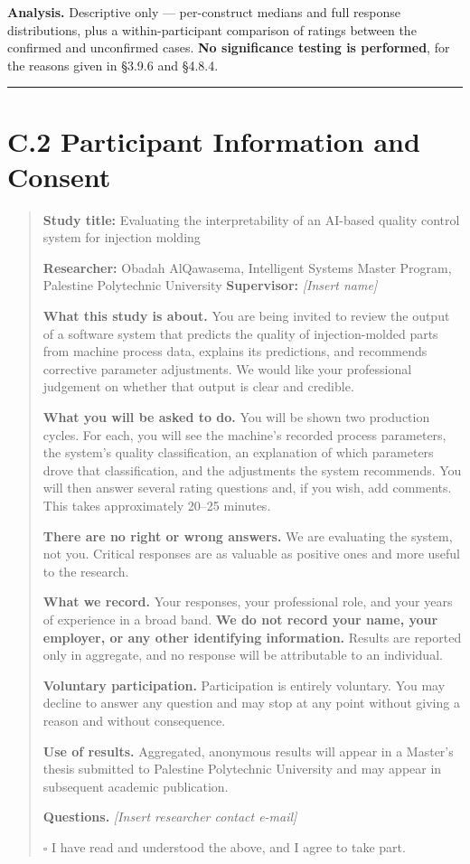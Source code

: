 \textbf{Analysis.} Descriptive only --- per-construct medians and full response distributions, plus a within-participant comparison of ratings between the confirmed and unconfirmed cases. \textbf{No significance testing is performed}, for the reasons given in §3.9.6 and §4.8.4.

\begin{center}\rule{0.5\linewidth}{0.5pt}\end{center}

\hypertarget{c.2-participant-information-and-consent}{%
\section{C.2 Participant Information and Consent}\label{c.2-participant-information-and-consent}}

\begin{quote}
\textbf{Study title:} Evaluating the interpretability of an AI-based quality control system for injection molding

\textbf{Researcher:} Obadah AlQawasema, Intelligent Systems Master Program, Palestine Polytechnic University
\textbf{Supervisor:} \emph{{[}Insert name{]}}

\textbf{What this study is about.} You are being invited to review the output of a software system that predicts the quality of injection-molded parts from machine process data, explains its predictions, and recommends corrective parameter adjustments. We would like your professional judgement on whether that output is clear and credible.

\textbf{What you will be asked to do.} You will be shown two production cycles. For each, you will see the machine's recorded process parameters, the system's quality classification, an explanation of which parameters drove that classification, and the adjustments the system recommends. You will then answer several rating questions and, if you wish, add comments. This takes approximately 20--25 minutes.

\textbf{There are no right or wrong answers.} We are evaluating the system, not you. Critical responses are as valuable as positive ones and more useful to the research.

\textbf{What we record.} Your responses, your professional role, and your years of experience in a broad band. \textbf{We do not record your name, your employer, or any other identifying information.} Results are reported only in aggregate, and no response will be attributable to an individual.

\textbf{Voluntary participation.} Participation is entirely voluntary. You may decline to answer any question and may stop at any point without giving a reason and without consequence.

\textbf{Use of results.} Aggregated, anonymous results will appear in a Master's thesis submitted to Palestine Polytechnic University and may appear in subsequent academic publication.

\textbf{Questions.} \emph{{[}Insert researcher contact e-mail{]}}

$\square$ I have read and understood the above, and I agree to take part.
\end{quote}

